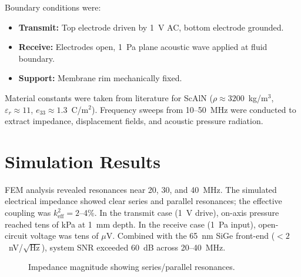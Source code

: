 \documentclass[conference]{IEEEtran}
\begin{document}
Boundary conditions were:
\begin{itemize}
  \item \textbf{Transmit:} Top electrode driven by 1~V AC, bottom electrode grounded.
  \item \textbf{Receive:} Electrodes open, 1~Pa plane acoustic wave applied at fluid boundary.
  \item \textbf{Support:} Membrane rim mechanically fixed.
\end{itemize}

Material constants were taken from literature for ScAlN ($\rho\!\approx\!3200$~kg/m$^3$, $\varepsilon_r\!\approx\!11$, $e_{33}\!\approx\!1.3$~C/m$^2$). Frequency sweeps from 10--50~MHz were conducted to extract impedance, displacement fields, and acoustic pressure radiation.

\section{Simulation Results}
FEM analysis revealed resonances near 20, 30, and 40~MHz. The simulated electrical impedance showed clear series and parallel resonances; the effective coupling was $k^2_{\mathrm{eff}}=2$--4\%. In the transmit case (1~V drive), on-axis pressure reached tens of kPa at 1~mm depth. In the receive case (1~Pa input), open-circuit voltage was tens of $\mu$V. Combined with the 65~nm SiGe front-end ($<2$~nV/$\sqrt{\mathrm{Hz}}$), system SNR exceeded 60~dB across 20--40~MHz.

\begin{figure}[!t]
\centering
{}
\caption{Impedance magnitude showing series/parallel resonances.}
\label{fig:imp}
\end{figure}
\end{document}
